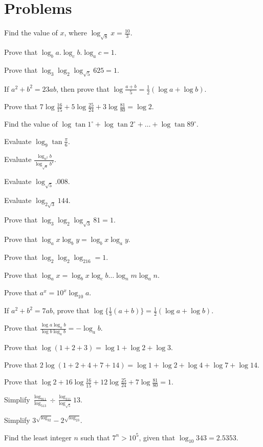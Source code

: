 \section{Problems}
\startitemize[n]
\item Find the value of $x$, where $\log_{\sqrt{8}} x = \frac{10}{3}$.
\item Prove that $\log_ba.\log_cb.\log_ac = 1$.
\item Prove that $\log_3\log_2\log_{\sqrt{5}}625 = 1$.
\item If $a^2 + b^2 = 23ab$, then prove that $\log\frac{a + b}{5} = \frac{1}{2}(\log a + \log b)$.
\item Prove that $7\log\frac{16}{15} + 5\log\frac{25}{24} + 3\log\frac{81}{80} = \log 2$.
\item Find the value of $\log\tan1^\circ + \log\tan2^\circ + \ldots + \log\tan89^\circ$.
\item Evaluate $\log_9\tan\frac{\pi}{6}$.
\item Evaluate $\frac{\log_{a^2}b}{\log_{\sqrt{a}}b^2}$.
\item Evaluate $\log_{\sqrt{5}}.008$.
\item Evaluate $\log_{2\sqrt{3}}144$.
\item Prove that $\log_3\log_2\log_{\sqrt{3}}81 = 1$.
\item Prove that $\log_ax\log_by = \log_bx\log_ay$.
\item Prove that $\log_2\log_2\log_216 = 1$.
\item Prove that $\log_ax = \log_bx\log_cb\ldots\log_nm\log_an$.
\item Prove that $a^x = 10^x\log_{10}a$.
\item If $a^2 + b^2 = 7ab$, prove that $\log\{\frac{1}{3}(a + b)\} = \frac{1}{2}(\log a + \log b)$.
\item Prove that $\frac{\log a\log_ab}{\log b\log_ab} = -\log_ab$.
\item Prove that $\log(1 + 2 + 3) = \log 1 + \log 2 + \log 3$.
\item Prove that $2\log(1 + 2 + 4 + 7 + 14) = \log 1 + \log 2 + \log 4 + \log 7 + \log 14$.
\item Prove that $\log 2 + 16\log\frac{16}{15} + 12\log\frac{25}{24} + 7\log\frac{81}{80} = 1$.
\item Simplify $\frac{\log_911}{\log_513}\div\frac{\log_311}{\log_{\sqrt{5}}}13$.
\item Simplify $3^{\sqrt{\log_32}} - 2^{\sqrt{\log_23}}$.
\item Find the least integer $n$ such that $7^n > 10^5$, given that $\log_{10}343 = 2.5353$.
